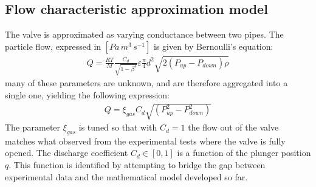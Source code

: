 \documentclass[letterpaper, 10pt, conference]{ieeeconf}
\begin{document}
\subsection{Flow characteristic approximation model}\label{sec:flow_charac}
The valve is approximated as varying conductance between two pipes. The particle flow, expressed in $[\unit{Pa\,m^{3}\,s^{-1}}]$ is given by Bernoulli's equation:
\begin{align}
    Q = \frac{RT}{M} \frac{C_d}{\sqrt{1-\beta^4}}\varepsilon\frac{\pi}{4}d^2\sqrt{2(P_{up}-P_{down})\rho}
\end{align}
many of these parameters are unknown, and are therefore aggregated into a single one, yielding the following expression:
\begin{align}
    Q = \xi_{gas}C_d\sqrt{\left(P_{up}^2-P_{down}^2\right)}
\end{align}
The parameter $\xi_{gas}$ is tuned so that with $C_d=1$ the flow out of the valve matches what observed from the experimental tests where the valve is fully opened. 
The discharge coefficient $C_d\in[0,1]$ is a function of the plunger position $q$. This function is identified by attempting to bridge the gap between experimental data and the mathematical model developed so far.
\end{document}
